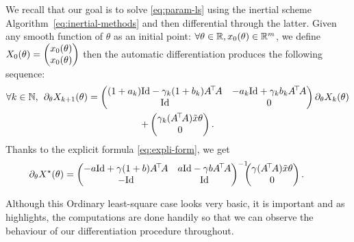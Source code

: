 We recall that our goal is to solve \ref{eq:param-ls} using the inertial scheme Algorithm~\ref{eq:inertial-methods} and then differential through the latter. Given any smooth function of $\theta$ as an initial point: $\forall \theta\in \mathbb{R}, x_{0}(\theta)\in\mathbb{R}^m$, we define $X_0(\theta)=\begin{pmatrix} x_{0}(\theta)\\ x_{0}(\theta)\end{pmatrix}$ then the automatic differentiation produces the following sequence:
\begin{multline}
 \forall k\in\bbN, \quad  \hspace{-0.2cm} \partial_{\theta}X_{k+1}(\theta)= \begin{pmatrix} (1+\ak)\Id-\gak(1+\bk)\transp{A}A &-\ak\Id+\gak\bk\transp{A}A \\
		 \Id  & 0\end{pmatrix}\partial_{\theta}X_k(\theta)\\+\begin{pmatrix} \gak\pa{\transp{A}A}\tilde{x}\theta  \\  
		0\end{pmatrix}.
\end{multline}
Thanks to  the explicit formula \eqref{eq:expli-form}, we get 
  \begin{equation}
 \hspace{-0.8cm}\partial_{\theta}X^{\star}\pa{\theta}=\begin{pmatrix} -a\Id+\gamma(1+b)\transp{A}A &a\Id-\gamma b\transp{A}A \\ -\Id  & 
		\Id\end{pmatrix}^{-1}\hspace{-0.2cm}\begin{pmatrix} \gamma\pa{\transp{A}A}\tilde{x}\theta  \\  
		0\end{pmatrix}.
\end{equation}
\begin{remark} Although this Ordinary least-square case looks very basic, it is important  and as highlights, the computations are done handily so that we can observe the behaviour of our  differentiation procedure throughout.   
\end{remark}
\vspace{-0.8cm}
